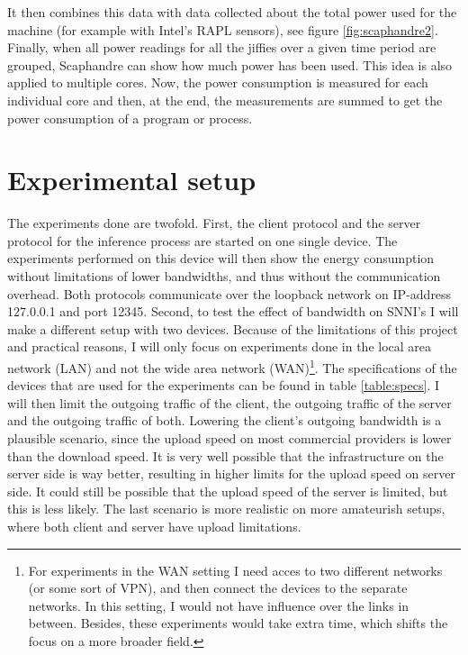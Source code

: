 \documentclass[../thesis.tex]{subfiles}
\begin{document}
It then combines this data with data collected about the total power used for the machine (for example with Intel's RAPL sensors), see figure \ref{fig:scaphandre2}. Finally, when all power readings for all the jiffies over a given time period are grouped, Scaphandre can show how much power has been used. This idea is also applied to multiple cores. Now, the power consumption is measured for each individual core and then, at the end, the measurements are summed to get the power consumption of a program or process.




\section{Experimental setup}
The experiments done are twofold. First, the client protocol and the server protocol for the inference process are started on one single device. The experiments performed on this device will then show the energy consumption without limitations of lower bandwidths, and thus without the communication overhead. Both protocols communicate over the loopback network on IP-address 127.0.0.1 and port 12345. Second, to test the effect of bandwidth on SNNI's I will make a different setup with two devices. Because of the limitations of this project and practical reasons, I will only focus on experiments done in the local area network (LAN) and not the wide area network (WAN)\footnote{For experiments in the WAN setting I need acces to two different networks (or some sort of VPN), and then connect the devices to the separate networks. In this setting, I would not have influence over the links in between. Besides, these experiments would take extra time, which shifts the focus on a more broader field.}. The specifications of the devices that are used for the experiments can be found in table \ref{table:specs}. I will then limit the outgoing traffic of the client, the outgoing traffic of the server and the outgoing traffic of both. Lowering the client's outgoing bandwidth is a plausible scenario, since the upload speed on most commercial providers is lower than the download speed. It is very well possible that the infrastructure on the server side is way better, resulting in higher limits for the upload speed on server side. It could still be possible that the upload speed of the server is limited, but this is less likely. The last scenario is more realistic on more amateurish setups, where both client and server have upload limitations. 
\end{document}
